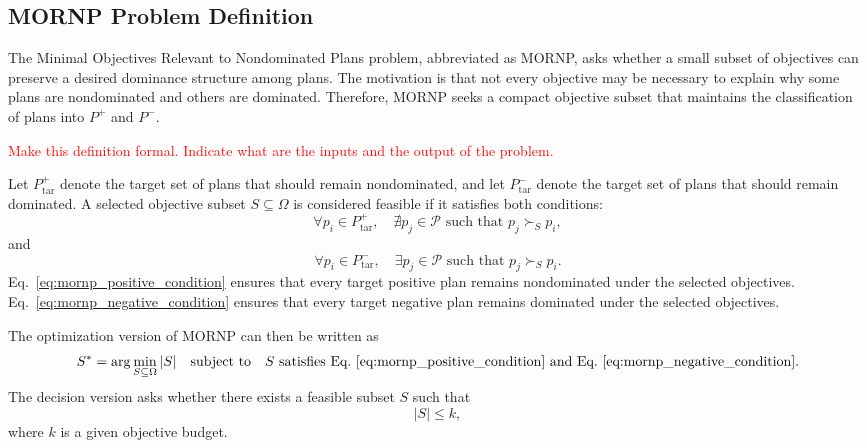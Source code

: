 \subsection{MORNP Problem Definition}
\label{subsec:mornp_definition}

\begin{problem}
    The Minimal Objectives Relevant to Nondominated Plans problem, abbreviated as MORNP, asks whether a small subset of objectives can preserve a desired dominance structure among plans. The motivation is that not every objective may be necessary to explain why some plans are nondominated and others are dominated. Therefore, MORNP seeks a compact objective subset that maintains the classification of plans into $P^{+}$ and $P^{-}$.
\end{problem}
\textcolor{red}{Make this definition formal. Indicate what are the inputs and the output of the problem.}



Let $P^{+}_{\text{tar}}$ denote the target set of plans that should remain nondominated, and let $P^{-}_{\text{tar}}$ denote the target set of plans that should remain dominated. A selected objective subset $S \subseteq \Omega$ is considered feasible if it satisfies both conditions:
\begin{equation}
    \forall p_i \in P^{+}_{\text{tar}},
    \quad
    \nexists p_j \in \mathcal{P}
    \text{ such that }
    p_j \succ_S p_i,
    \label{eq:mornp_positive_condition}
\end{equation}
and
\begin{equation}
    \forall p_i \in P^{-}_{\text{tar}},
    \quad
    \exists p_j \in \mathcal{P}
    \text{ such that }
    p_j \succ_S p_i.
    \label{eq:mornp_negative_condition}
\end{equation}
Eq.~\eqref{eq:mornp_positive_condition} ensures that every target positive plan remains nondominated under the selected objectives. Eq.~\eqref{eq:mornp_negative_condition} ensures that every target negative plan remains dominated under the selected objectives.

The optimization version of MORNP can then be written as
\begin{equation}
    S^{*}
    =
    \arg\min_{S \subseteq \Omega}
    |S|
    \quad
    \text{subject to}
    \quad
    S \text{ satisfies Eq.~\eqref{eq:mornp_positive_condition} and Eq.~\eqref{eq:mornp_negative_condition}}.
    \label{eq:mornp_optimization}
\end{equation}
The decision version asks whether there exists a feasible subset $S$ such that
\begin{equation}
    |S| \leq k,
    \label{eq:mornp_decision}
\end{equation}
where $k$ is a given objective budget.

